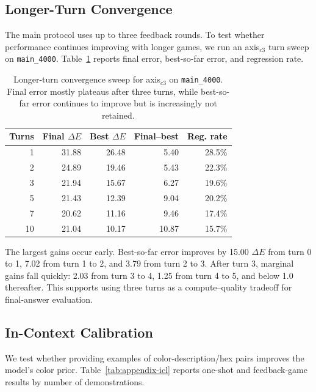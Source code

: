 \documentclass[11pt]{article}
\begin{document}
\subsection{Longer-Turn Convergence}
\label{ap:longer-turn}

The main protocol uses up to three feedback rounds. To test whether
performance continues improving with longer games, we run an axis$_{c3}$
turn sweep on \texttt{main\_4000}. Table~\ref{tab:appendix-convergence}
reports final error, best-so-far error, and regression rate.

\begin{table}[h]
\centering
\small
\begin{tabular}{@{}rrrrr@{}}
\toprule
Turns & Final $\Delta E$ & Best $\Delta E$ & Final--best & Reg. rate \\
\midrule
1  & 31.88 & 26.48 & 5.40  & 28.5\% \\
2  & 24.89 & 19.46 & 5.43  & 22.3\% \\
3  & 21.94 & 15.67 & 6.27  & 19.6\% \\
5  & 21.43 & 12.39 & 9.04  & 20.2\% \\
7  & 20.62 & 11.16 & 9.46  & 17.4\% \\
10 & 21.04 & 10.17 & 10.87 & 15.7\% \\
\bottomrule
\end{tabular}
\caption{
Longer-turn convergence sweep for axis$_{c3}$ on \texttt{main\_4000}.
Final error mostly plateaus after three turns, while best-so-far error
continues to improve but is increasingly not retained.
}
\label{tab:appendix-convergence}
\end{table}

The largest gains occur early. Best-so-far error improves by 15.00
$\Delta E$ from turn 0 to 1, 7.02 from turn 1 to 2, and 3.79 from turn 2
to 3. After turn 3, marginal gains fall quickly: 2.03 from turn 3 to 4,
1.25 from turn 4 to 5, and below 1.0 thereafter. This supports using three
turns as a compute--quality tradeoff for final-answer evaluation.

\subsection{In-Context Calibration}
\label{ap:icl-experiments}
We test whether providing examples of color-description/hex pairs improves
the model's color prior. Table~\ref{tab:appendix-icl} reports one-shot and
feedback-game results by number of demonstrations.
\end{document}
